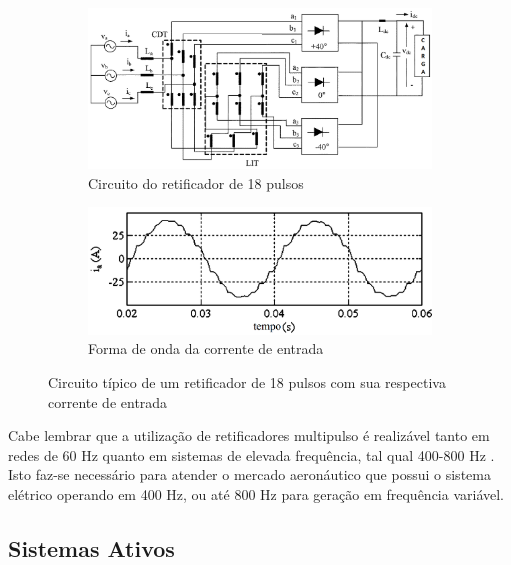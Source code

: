 \begin{figure}[!htbp] %
	\centering
	\begin{subfigure}[b]{0.49\textwidth}
		\centering
		\includegraphics[width=\textwidth]{Cap2/Figuras/18_pulse_rectifier.png}
		\caption{Circuito do retificador de 18 pulsos} 
		\label{fig:18_pulse_rectifier}
	\end{subfigure}%
	\hfill
	\begin{subfigure}[b]{0.49\textwidth}  
		\centering 
		\includegraphics[width=\textwidth]{Cap2/Figuras/18_pulse_wave.png}
		\caption{Forma de onda da corrente de entrada}    
		\label{fig:18_pulse_wave}
	\end{subfigure}%
	\caption{Circuito típico de um retificador de 18 pulsos com sua respectiva corrente de entrada \cite{Singh2008}}
	\label{fig:18_pulse}
\end{figure}

Cabe lembrar que a utilização de retificadores multipulso é realizável tanto em redes de 60 Hz quanto em sistemas de elevada frequência, tal qual 400-800 Hz \cite{Gong2003,Lobo2005}. Isto faz-se necessário para atender o mercado aeronáutico que possui o sistema elétrico operando em 400 Hz, ou até 800 Hz para geração em frequência variável.

\subsection{Sistemas Ativos}

